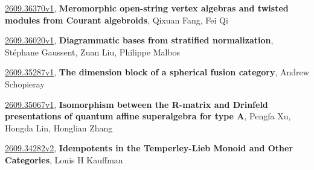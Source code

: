 \documentclass[9pt, a4paper]{article}
\theoremstyle{plain}
\theoremstyle{definition}
\theoremstyle{remark}
\newcommand{\arxiv}[3]{\href{https://arxiv.org/abs/#1}{#1}, \textbf{\textcolor{arxivblue}{#2}}, #3}
\begin{document}
\arxiv{2609.36370v1}{Meromorphic open-string vertex algebras and twisted modules from Courant algebroids}{Qixuan Fang, Fei Qi}

\arxiv{2609.36020v1}{Diagrammatic bases from stratified normalization}{Stéphane Gaussent, Zuan Liu, Philippe Malbos}

\arxiv{2609.35287v1}{The dimension block of a spherical fusion category}{Andrew Schopieray}

\arxiv{2609.35067v1}{Isomorphism between the R-matrix and Drinfeld presentations of quantum affine superalgebra for type $\boldsymbol{A}$}{Pengfa Xu, Hongda Lin, Honglian Zhang}

\arxiv{2609.34282v2}{Idempotents in the Temperley-Lieb Monoid and Other Categories}{Louis H Kauffman}

\end{document}
